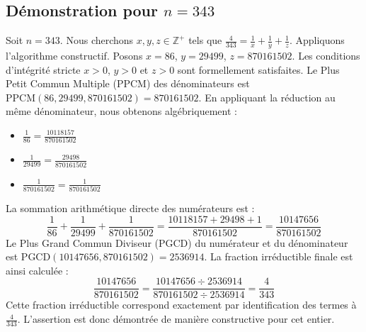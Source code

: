 \documentclass[11pt,a4paper]{article}
\begin{document}
\subsection{Démonstration pour $n = 343$}
Soit $n = 343$. Nous cherchons $x, y, z \in \mathbb{Z}^{+}$ tels que $\frac{4}{343} = \frac{1}{x} + \frac{1}{y} + \frac{1}{z}$.
Appliquons l'algorithme constructif. Posons $x = 86$, $y = 29499$, $z = 870161502$.
Les conditions d'intégrité stricte $x > 0$, $y > 0$ et $z > 0$ sont formellement satisfaites.
Le Plus Petit Commun Multiple (PPCM) des dénominateurs est $\text{PPCM}(86, 29499, 870161502) = 870161502$.
En appliquant la réduction au même dénominateur, nous obtenons algébriquement :
\begin{itemize}
    \item $\frac{1}{86} = \frac{10118157}{870161502}$
    \item $\frac{1}{29499} = \frac{29498}{870161502}$
    \item $\frac{1}{870161502} = \frac{1}{870161502}$
\end{itemize}
La sommation arithmétique directe des numérateurs est :
$$ \frac{1}{86} + \frac{1}{29499} + \frac{1}{870161502} = \frac{10118157 + 29498 + 1}{870161502} = \frac{10147656}{870161502} $$
Le Plus Grand Commun Diviseur (PGCD) du numérateur et du dénominateur est $\text{PGCD}(10147656, 870161502) = 2536914$.
La fraction irréductible finale est ainsi calculée :
$$ \frac{10147656}{870161502} = \frac{10147656 \div 2536914}{870161502 \div 2536914} = \frac{4}{343} $$
Cette fraction irréductible correspond exactement par identification des termes à $\frac{4}{343}$. L'assertion est donc démontrée de manière constructive pour cet entier.
\end{document}
